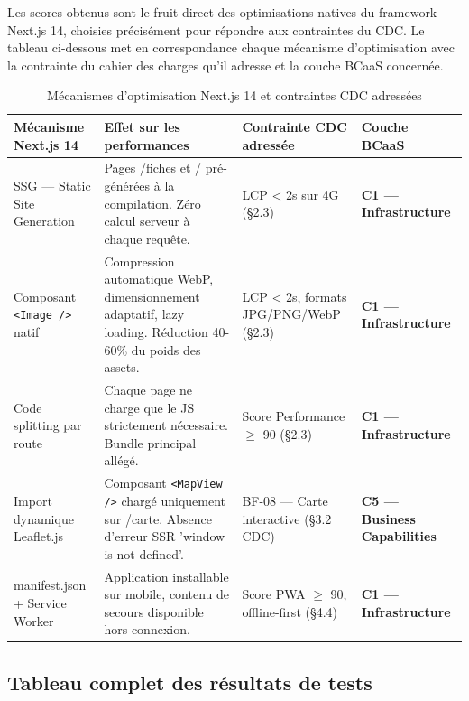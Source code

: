 \documentclass[12pt,a4paper]{report}
\begin{document}
Les scores obtenus sont le fruit direct des optimisations natives du framework Next.js 14, choisies précisément pour répondre aux contraintes du CDC. Le tableau ci-dessous met en correspondance chaque mécanisme d'optimisation avec la contrainte du cahier des charges qu'il adresse et la couche BCaaS concernée.

\begin{table}[H]
\centering
\caption{Mécanismes d'optimisation Next.js 14 et contraintes CDC adressées}
\label{tab:optimizations}
\renewcommand{\arraystretch}{1.4}
\small
\begin{tabular}{|p{}|p{}|p{}|p{}|}
\hline
\textbf{Mécanisme Next.js 14} & \textbf{Effet sur les performances} & \textbf{Contrainte CDC adressée} & \textbf{Couche BCaaS} \\
\hline
SSG --- Static Site Generation & Pages /fiches et / pré-générées à la compilation. Zéro calcul serveur à chaque requête. & LCP < 2s sur 4G (§2.3) & \textbf{C1 --- Infrastructure} \\
\hline
Composant \texttt{<Image />} natif & Compression automatique WebP, dimensionnement adaptatif, lazy loading. Réduction 40-60\% du poids des assets. & LCP < 2s, formats JPG/PNG/WebP (§2.3) & \textbf{C1 --- Infrastructure} \\
\hline
Code splitting par route & Chaque page ne charge que le JS strictement nécessaire. Bundle principal allégé. & Score Performance $\geq$ 90 (§2.3) & \textbf{C1 --- Infrastructure} \\
\hline
Import dynamique Leaflet.js & Composant \texttt{<MapView />} chargé uniquement sur /carte. Absence d'erreur SSR 'window is not defined'. & BF-08 --- Carte interactive (§3.2 CDC) & \textbf{C5 --- Business Capabilities} \\
\hline
manifest.json + Service Worker & Application installable sur mobile, contenu de secours disponible hors connexion. & Score PWA $\geq$ 90, offline-first (§4.4) & \textbf{C1 --- Infrastructure} \\
\hline
\end{tabular}
\end{table}

\subsection{Tableau complet des résultats de tests}
\end{document}
